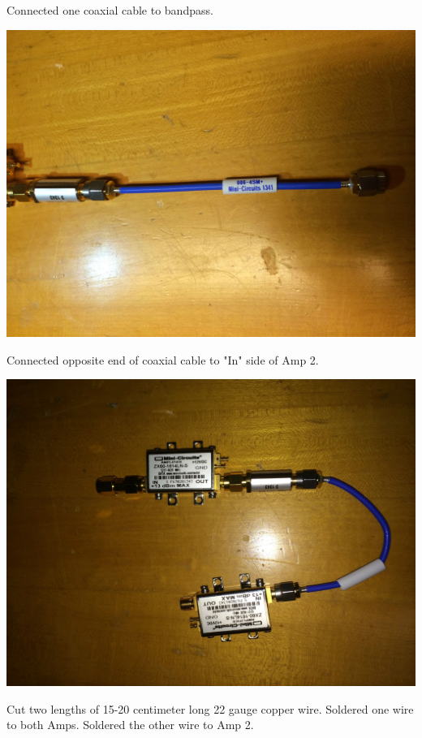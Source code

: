 \documentclass[11pt]{article} %
\begin{document}
Connected one coaxial cable to bandpass. 

\begin{center}
\includegraphics[scale=0.12]{lna/02.jpeg}
\end{center}

Connected opposite end of coaxial cable to "In" side of Amp 2. 

\begin{center}
\includegraphics[scale=0.14]{lna/03.jpeg}
\end{center}

Cut two lengths of 15-20 centimeter long 22 gauge copper wire. 
Soldered one wire to both Amps.
Soldered the other wire to Amp 2. 
\end{document}
